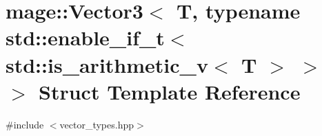 \hypertarget{structmage_1_1_vector3_3_01_t_00_01typename_01std_1_1enable__if__t_3_01std_1_1is__arithmetic__v_3_01_t_01_4_01_4_01_4}{}\section{mage\+:\+:Vector3$<$ T, typename std\+:\+:enable\+\_\+if\+\_\+t$<$ std\+:\+:is\+\_\+arithmetic\+\_\+v$<$ T $>$ $>$ $>$ Struct Template Reference}
\label{structmage_1_1_vector3_3_01_t_00_01typename_01std_1_1enable__if__t_3_01std_1_1is__arithmetic__v_3_01_t_01_4_01_4_01_4}


{\ttfamily \#include $<$vector\+\_\+types.\+hpp$>$}


